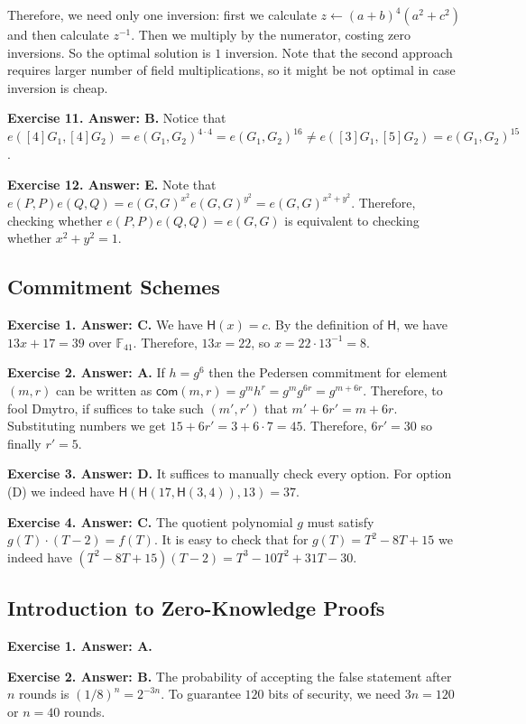 \documentclass[../../book]{subfiles}
\begin{document}
Therefore, we need only one inversion: first we calculate $z \gets (a+b)^4(a^2+c^2)$ and then calculate $z^{-1}$. Then we multiply 
by the numerator, costing zero inversions. So the optimal solution is $1$ inversion. Note that the second approach 
requires larger number of field multiplications, so it might be not optimal in case inversion is cheap.

\textbf{Exercise 11. Answer: B.} Notice that $e([4]G_1,[4]G_2)=e(G_1,G_2)^{4 \cdot 4} = e(G_1,G_2)^{16} \neq e([3]G_1,[5]G_2)=e(G_1,G_2)^{15}$.

\textbf{Exercise 12. Answer: E.} Note that
$e(P,P)e(Q,Q)=e(G,G)^{x^2}e(G,G)^{y^2}=e(G,G)^{x^2+y^2}$. Therefore, checking
whether $e(P,P)e(Q,Q)=e(G,G)$ is equivalent to checking whether $x^2+y^2=1$.

\subsection*{Commitment Schemes}

\textbf{Exercise 1. Answer: C.} We have $\mathsf{H}(x)=c$. By the definition of $\mathsf{H}$,
we have $13x+17=39$ over $\mathbb{F}_{41}$. Therefore, $13x=22$,
so $x=22 \cdot 13^{-1} = 8$. 

\textbf{Exercise 2. Answer: A.} If $h=g^6$ then the Pedersen commitment for element
$(m,r)$ can be written as $\mathsf{com}(m,r) = g^mh^r=g^mg^{6r}=g^{m+6r}$.
Therefore, to fool Dmytro, if suffices to take such $(m',r')$ that
$m'+6r'=m+6r$. Substituting numbers we get $15+6r'=3+6\cdot 7=45$.
Therefore, $6r'=30$ so finally $r'=5$.

\textbf{Exercise 3. Answer: D.} It suffices to manually check every option. For
option (D) we indeed have $\mathsf{H}(\mathsf{H}(17, \mathsf{H}(3,4)), 13) = 37$.  

\textbf{Exercise 4. Answer: C.} The quotient polynomial $g$ must satisfy
$g(T)\cdot (T-2)=f(T)$. It is easy to check that for $g(T)=T^2-8T+15$ we indeed
have $(T^2-8T+15)(T-2) = T^3-10T^2+31T-30$.

\subsection*{Introduction to Zero-Knowledge Proofs}

\textbf{Exercise 1. Answer: A.}

\textbf{Exercise 2. Answer: B.} The probability of accepting the false statement after 
$n$ rounds is $(1/8)^n=2^{-3n}$. To guarantee $120$ bits of security, we 
need $3n=120$ or $n=40$ rounds.
\end{document}
